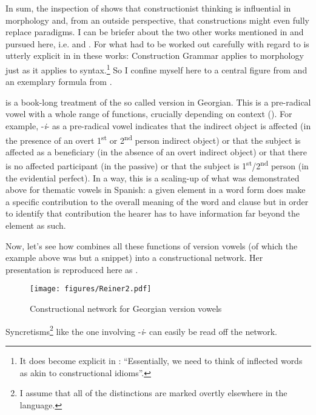 \documentclass[output=paper]{langsci/langscibook}
\begin{document}
In sum, the inspection of \citet{Spencer2001} shows that constructionist thinking is influential in morphology and, from an outside perspective, that constructions might even fully replace paradigms. I can be briefer about the two other works mentioned in \citet[59]{Haspelmath2011} and pursued here, i.e. \citet{Gurevich2006} and \citet{Booij2010}. For what had to be worked out carefully with regard to \citet{Spencer2001} is utterly explicit in in these works: Construction Grammar applies to morphology just as it applies to syntax.\footnote{It does become explicit in \citet[84]{Spencer2004}: “Essentially, we need to think of inflected words as akin to constructional idioms”.} So I confine myself here to a central figure from \citet[170]{Gurevich2006} and an exemplary formula from \citet[241]{Booij2010}.

\citet{Gurevich2006} is a book-long treatment of the so called version in Georgian. This is a pre-radical vowel with a whole range of functions, crucially depending on context (\citealt[6--13]{Gurevich2006}). For example, \nobreakdash-\textit{i}\nobreakdash- as a pre-radical vowel indicates that the indirect object is affected (in the presence of an overt 1\textsuperscript{st} or 2\textsuperscript{nd} person indirect object) or that the subject is affected as a beneficiary (in the absence of an overt indirect object) or that there is no affected participant (in the passive) or that the subject is 1\textsuperscript{st}/2\textsuperscript{nd} person (in the evidential perfect). In a way, this is a scaling-up of what was demonstrated above for thematic vowels in Spanish: a given element in a word form does make a specific contribution to the overall meaning of the word and clause but in order to identify that contribution the hearer has to have information far beyond the element as such.

Now, let’s see how \citet[170]{Gurevich2006} combines all these functions of version vowels (of which the example above was but a snippet) into a constructional network. Her presentation is reproduced here as .

  
\begin{figure}
\texttt{[image: figures/Reiner2.pdf]}
 \caption{Constructional network for Georgian version vowels\linebreak\citep[170]{Gurevich2006}}
 \label{fig:reiner:2}
\end{figure}

Syncretisms\footnote{I assume that all of the distinctions are marked overtly elsewhere in the language.} like the one involving \nobreakdash-\textit{i}\nobreakdash- can easily be read off the network.
\end{document}
